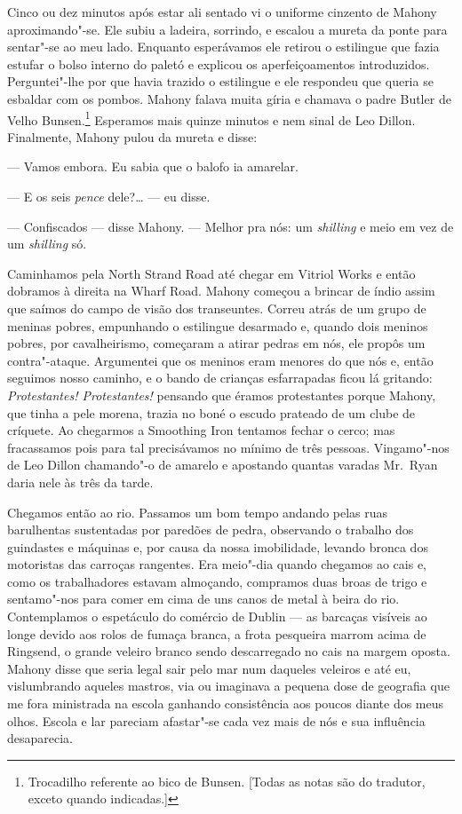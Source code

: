 Cinco ou dez minutos após estar ali sentado vi o uniforme cinzento de Mahony
aproximando"-se.  Ele subiu a ladeira, sorrindo, e escalou a mureta da ponte
para sentar"-se ao meu lado.  Enquanto esperávamos ele retirou o estilingue que
fazia estufar o bolso interno do paletó e explicou os aperfeiçoamentos
introduzidos.  Perguntei"-lhe por que havia trazido o estilingue e ele respondeu
que queria se esbaldar com os pombos.  Mahony falava muita gíria e chamava o
padre Butler de Velho Bunsen.\footnote{ Trocadilho referente ao
bico de Bunsen. [Todas as notas são do tradutor, exceto quando indicadas.]}  
Esperamos mais quinze minutos e nem sinal de Leo
Dillon.  Finalmente, Mahony pulou da mureta e disse:

--- Vamos embora.  Eu sabia que o balofo ia amarelar.

--- E os seis \textit{pence} dele?\ldots{} --- eu disse.

--- Confiscados --- disse Mahony.  --- Melhor pra nós: um \textit{shilling} e
meio em vez de um \textit{shilling} só.

Caminhamos pela North Strand Road até chegar em Vitriol Works e então dobramos
à direita na Wharf Road.  Mahony começou a brincar de índio assim que saímos do
campo de visão dos transeuntes.  Correu atrás de um grupo de meninas pobres,
empunhando o estilingue desarmado e, quando dois meninos pobres, por
cavalheirismo, começaram a atirar pedras em nós, ele propôs um contra"-ataque.
Argumentei que os meninos eram menores do que nós e, então seguimos nosso
caminho, e o bando de crianças esfarrapadas ficou lá gritando:
\textit{Protestantes! Protestantes!} pensando que éramos protestantes porque
Mahony, que tinha a pele morena, trazia no boné o escudo prateado de um clube
de críquete.  Ao chegarmos a Smoothing Iron tentamos fechar o cerco; mas
fracassamos pois para tal precisávamos no mínimo de três pessoas.  Vingamo"-nos
de Leo Dillon chamando"-o de amarelo e apostando quantas varadas Mr.~Ryan daria
nele às três da tarde.

Chegamos então ao rio.  Passamos um bom tempo andando pelas ruas barulhentas
sustentadas por paredões de pedra, observando o trabalho dos guindastes e
máquinas e, por causa da nossa imobilidade, levando bronca dos motoristas das
carroças rangentes.  Era meio"-dia quando chegamos ao cais e, como os
trabalhadores estavam almoçando, compramos duas broas de trigo e sentamo"-nos
para comer em cima de uns canos de metal à beira do rio.  Contemplamos o
espetáculo do comércio de Dublin --- as barcaças visíveis ao longe devido aos
rolos de fumaça branca, a frota pesqueira marrom acima de Ringsend, o grande
veleiro branco sendo descarregado no cais na margem oposta.  Mahony disse que
seria legal sair pelo mar num daqueles veleiros e até eu, vislumbrando aqueles
mastros, via ou imaginava a pequena dose de geografia que me fora ministrada na
escola ganhando consistência aos poucos diante dos meus olhos.  Escola e lar
pareciam afastar"-se cada vez mais de nós e sua influência desaparecia.

